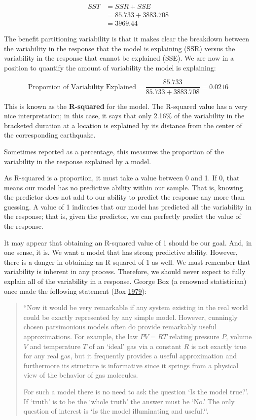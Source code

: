 \documentclass[]{book}
\theoremstyle{plain}
\theoremstyle{mydefn}
\theoremstyle{myexmpl}
\theoremstyle{remark}
\let\BeginKnitrBlock\begin \let\EndKnitrBlock\end
\let\BeginKnitrBlock\begin \let\EndKnitrBlock\end
\begin{document}
\[
\begin{aligned}
  SST &= SSR + SSE \\
    &= 85.733 + 3883.708 \\
    &= 3969.44
\end{aligned}
\]

The benefit partitioning variability is that it makes clear the
breakdown between the variability in the response that the model is
explaining (SSR) versus the variability in the response that cannot be
explained (SSE). We are now in a position to quantify the amount of
variability the model is explaining:

\[\text{Proportion of Variability Explained} = \frac{85.733}{85.733 + 3883.708} = 0.0216\]

This is known as the \textbf{R-squared} for the model. The R-squared
value has a very nice interpretation; in this case, it says that only
2.16\% of the variability in the bracketed duration at a location is
explained by its distance from the center of the corresponding
earthquake.

\BeginKnitrBlock{definition}[R Squared]
\protect\hypertarget{def:defn-r-squared}{}{\label{def:defn-r-squared}
{} }Sometimes reported as a percentage, this
measures the proportion of the variability in the response explained by
a model.
\EndKnitrBlock{definition}

As R-squared is a proportion, it must take a value between 0 and 1. If
0, that means our model has no predictive ability within our sample.
That is, knowing the predictor does not add to our ability to predict
the response any more than guessing. A value of 1 indicates that our
model has predicted all the variability in the response; that is, given
the predictor, we can perfectly predict the value of the response.

It may appear that obtaining an R-squared value of 1 should be our goal.
And, in one sense, it is. We want a model that has strong predictive
ability. However, there is a danger in obtaining an R-squared of 1 as
well. We must remember that variability is inherent in any process.
Therefore, we should never expect to fully explain all of the
variability in a response. George Box (a renowned statistician) once
made the following statement (Box
\protect\hyperlink{ref-Box1979}{1979}):

\begin{quote}
``Now it would be very remarkable if any system existing in the real
world could be exactly represented by any simple model. However,
cunningly chosen parsimonious models often do provide remarkably useful
approximations. For example, the law \(PV = RT\) relating pressure
\(P\), volume \(V\) and temperature \(T\) of an `ideal' gas via a
constant \(R\) is not exactly true for any real gas, but it frequently
provides a useful approximation and furthermore its structure is
informative since it springs from a physical view of the behavior of gas
molecules.

For such a model there is no need to ask the question `Is the model
true?'. If `truth' is to be the `whole truth' the answer must be `No.'
The only question of interest is `Is the model illuminating and
useful?'.
\end{quote}
\end{document}
